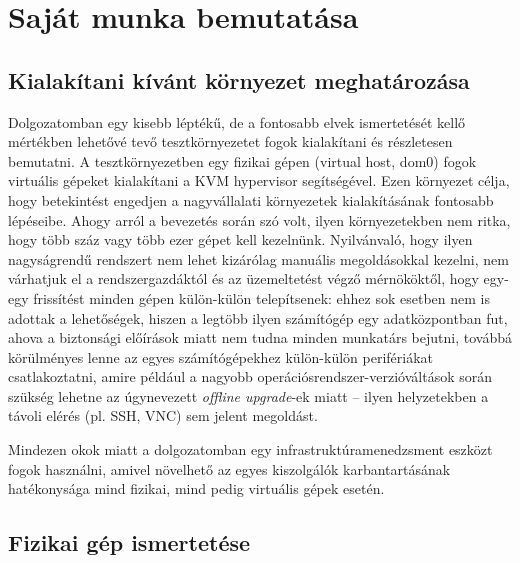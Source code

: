 
\chapter{Saját munka bemutatása}

\section{Kialakítani kívánt környezet meghatározása}
Dolgozatomban egy kisebb léptékű, de a fontosabb elvek ismertetését kellő mértékben lehetővé tevő tesztkörnyezetet fogok kialakítani és részletesen bemutatni. A tesztkörnyezetben egy fizikai gépen (virtual host, dom0) fogok virtuális gépeket kialakítani a KVM hypervisor segítségével. Ezen környezet célja, hogy betekintést engedjen a nagyvállalati környezetek kialakításának fontosabb lépéseibe. Ahogy arról a bevezetés során szó volt, ilyen környezetekben nem ritka, hogy több száz vagy több ezer gépet kell kezelnünk. Nyilvánvaló, hogy ilyen nagyságrendű rendszert nem lehet kizárólag manuális megoldásokkal kezelni, nem várhatjuk el a rendszergazdáktól és az üzemeltetést végző mérnököktől, hogy egy-egy frissítést minden gépen külön-külön telepítsenek: ehhez sok esetben nem is adottak a lehetőségek, hiszen a legtöbb ilyen számítógép egy adatközpontban fut, ahova a biztonsági előírások miatt nem tudna minden munkatárs bejutni, továbbá körülményes lenne az egyes számítógépekhez külön-külön perifériákat csatlakoztatni, amire például a nagyobb operációsrendszer-verzióváltások során szükség lehetne az úgynevezett \textit{offline upgrade}-ek miatt -- ilyen helyzetekben a távoli elérés (pl. SSH, VNC) %
sem jelent megoldást.

Mindezen okok miatt a dolgozatomban egy infrastruktúramenedzsment eszközt fogok használni, amivel növelhető az egyes kiszolgálók karbantartásának hatékonysága mind fizikai, mind pedig virtuális gépek esetén.

\section{Fizikai gép ismertetése}

